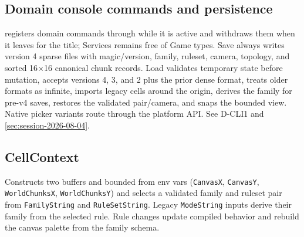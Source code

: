 \subsection{Domain console commands and persistence}
 registers domain commands through
 while it is active and withdraws them when it
leaves for the title; Services remains free of Game types. Save always
writes version 4 sparse files with magic/version, family, ruleset, camera, topology,
and sorted 16$\times$16 canonical chunk records. Load validates temporary
state before mutation, accepts versions 4, 3, and 2 plus the prior dense format,
treats older formats as infinite, imports legacy cells around the origin,
derives the family for pre-v4 saves, restores the validated pair/camera, and
snaps the bounded view. Native picker variants route through the platform
 API. See D-CLI1 and
\cref{sec:session-2026-08-04}.

\subsection{CellContext}
Constructs two  buffers and bounded
 from env vars (\texttt{CanvasX}, \texttt{CanvasY},
\texttt{WorldChunksX}, \texttt{WorldChunksY}) and selects a validated family
and ruleset pair from \texttt{FamilyString} and \texttt{RuleSetString}. Legacy
\texttt{ModeString} inputs derive their family from the selected rule. Rule
changes update compiled behavior and rebuild the canvas palette from the family
schema.

